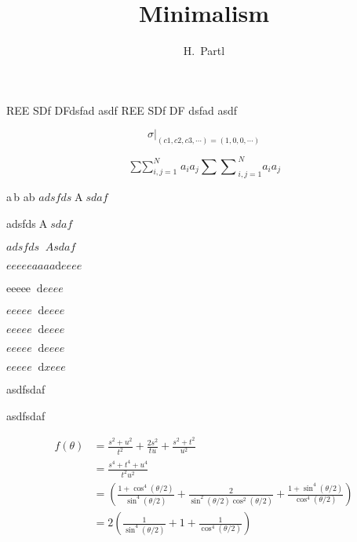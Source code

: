 \documentclass[UTF8]{article}
\author{H.~Partl}
\title{Minimalism}
\newcommand{\stud}{REE SDf DF}
\begin{document}
\stud dsfad asdf 
\stud{} dsfad asdf 

\begin{equation}
{\sigma |}_{(c1,c2,c3,\cdots)=(1,0,0,\cdots)}
\end{equation}

\begin{displaymath}
\mathop{\sum \sum}_{i,j=1}^{N} a_i a_j 
{\sum \sum}_{i,j=1}^{N} a_i a_j
\end{displaymath}

a\,b
a\!b
$adsfds\mathop{A}sdaf$

adsfds$\mathop{A}sdaf$

$adsfds\mathop{}Asdaf$

$eeeeeaaaa\!\mathrm{d}eeee$

eeeee$\mathop{}\!\mathrm{d}eeee$

$eeeee\mathop{}\!\mathrm{d}eeee$

$eeeee\mathop{} \mathrm{d}eeee$

$eeeee\mathop{}\mathrm{d}\!eeee$

$eeeee\mathop{}\mathrm{d}\!xeee$

    
    

    asdfsdaf

    asdfsdaf

    \begin{align}
        f(\theta) & =
        \frac{s^{2}+u^{2}}{t^{2}}+\frac{2 s^{2}}{t u}+\frac{s^{2}+t^{2}}{u^{2}} \nonumber \\ 
        & =
        \frac{s^{4}+t^{4}+u^{4}}{t^{2} u^{2}}      
        \nonumber \\
        & =
        \left(\frac{1+\cos ^{4}(\theta / 2)}{\sin ^{4}(\theta / 2)}+\frac{2}{\sin ^{2}(\theta / 2) \cos ^{2}(\theta / 2)}+\frac{1+\sin ^{4}(\theta / 2)}{\cos ^{4}(\theta / 2)}\right)
        \label{2.6.23} \\
        & =
        2\left(\frac{1}{\sin ^{4}(\theta / 2)}+1
        +\frac{1}{\cos ^{4}(\theta / 2)}\right) 
        \label{2.6.24}  
    \end{align}
\end{document}
